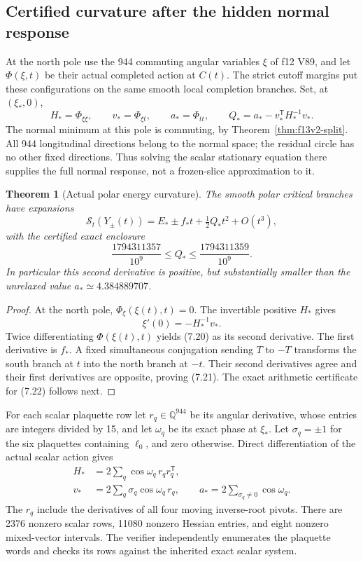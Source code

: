 \documentclass[11pt,oneside]{article}
\newtheorem{theorem}{Theorem}[section]
\newcommand{\cS}{\mathcal S}
\begin{document}
\subsection{Certified curvature after the hidden normal response}

At the north pole use the 944
commuting angular variables
\(\xi\) of f12 V89, and let
\(\Phi(\xi,t)\) be their actual
completed action at \(C(t)\).
The strict cutoff margins put
these configurations on the
same smooth local completion
branches. Set, at \((\xi_*,0)\),
\[
 H_*=\Phi_{\xi\xi},\qquad
 v_*=\Phi_{\xi t},\qquad
 a_*=\Phi_{tt},\qquad
 Q_*=a_*-v_*^{\mathsf T}H_*^{-1}v_* .
 \tag{7.20}
\]
The normal minimum at this pole
is commuting, by Theorem~\ref{thm:f13v2-split}.
All 944 longitudinal directions
belong to the normal space;
the residual circle has no other
fixed directions. Thus solving
the scalar stationary equation
there supplies the full normal
response, not a frozen-slice
approximation to it.

\begin{theorem}[Actual polar energy curvature]
\label{thm:f13v2-curvature}
The smooth polar critical branches
have expansions
\[
 \cS_t(Y_\pm(t))
       =E_*\pm f_*t+\tfrac12Q_*t^2+O(t^3),
 \tag{7.21}
\]
with the certified exact enclosure
\[
 \frac{1794311357}{10^9}\le Q_*
                              \le\frac{1794311359}{10^9}.
 \tag{7.22}
\]
In particular this second derivative
is positive, but substantially
smaller than the unrelaxed value
\(a_*\simeq4.384889707\).
\end{theorem}
\begin{proof}
At the north pole,
\(\Phi_\xi(\xi(t),t)=0\).
The invertible positive \(H_*\)
gives
\[
                       \xi'(0)=-H_*^{-1}v_*.
\]
Twice differentiating
\(\Phi(\xi(t),t)\) yields (7.20)
as its second derivative. The
first derivative is \(f_*\).
A fixed simultaneous conjugation
sending \(T\) to \(-T\) transforms
the south branch at \(t\) into
the north branch at \(-t\).
Their second derivatives agree
and their first derivatives
are opposite, proving (7.21).
The exact arithmetic certificate
for (7.22) follows next.
\end{proof}

For each scalar plaquette row let
\(r_q\in\mathbb Q^{944}\) be its
angular derivative, whose entries
are integers divided by 15, and
let \(\omega_q\) be its exact
phase at \(\xi_*\).
Let \(\sigma_q=\pm1\) for the
six plaquettes containing
\(\ell_0\), and zero otherwise.
Direct differentiation of the
actual scalar action gives
\[
 \begin{split}
 H_*&=2\sum_q\cos\omega_q\,r_qr_q^{\mathsf T},\\
 v_*&=2\sum_q\sigma_q\cos\omega_q\,r_q,\qquad
 a_*=2\sum_{\sigma_q\ne0}\cos\omega_q.
 \end{split}
 \tag{7.23}
\]
The \(r_q\) include the derivatives
of all four moving inverse-root
pivots. There are 2376 nonzero
scalar rows, 11080 nonzero
Hessian entries, and eight
nonzero mixed-vector intervals.
The verifier independently
enumerates the plaquette words
and checks its rows against the
inherited exact scalar system.
\end{document}
